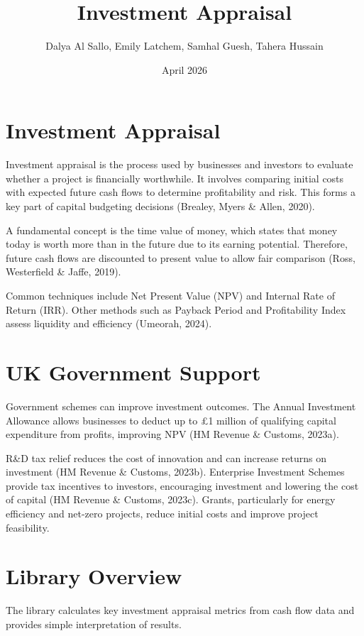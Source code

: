 \documentclass{article}
\title{Investment Appraisal}
\author{Dalya Al Sallo, Emily Latchem, Samhal Guesh, Tahera Hussain}
\date{April 2026}
\begin{document}
\maketitle

\section{Investment Appraisal}

Investment appraisal is the process used by businesses and investors to evaluate whether a project is financially worthwhile. It involves comparing initial costs with expected future cash flows to determine profitability and risk. This forms a key part of capital budgeting decisions (Brealey, Myers \& Allen, 2020).

A fundamental concept is the time value of money, which states that money today is worth more than in the future due to its earning potential. Therefore, future cash flows are discounted to present value to allow fair comparison (Ross, Westerfield \& Jaffe, 2019).

Common techniques include Net Present Value (NPV) and Internal Rate of Return (IRR). Other methods such as Payback Period and Profitability Index assess liquidity and efficiency (Umeorah, 2024).

\section{UK Government Support}

Government schemes can improve investment outcomes. The Annual Investment Allowance allows businesses to deduct up to £1 million of qualifying capital expenditure from profits, improving NPV (HM Revenue \& Customs, 2023a).

R\&D tax relief reduces the cost of innovation and can increase returns on investment (HM Revenue \& Customs, 2023b). Enterprise Investment Schemes provide tax incentives to investors, encouraging investment and lowering the cost of capital (HM Revenue \& Customs, 2023c). Grants, particularly for energy efficiency and net-zero projects, reduce initial costs and improve project feasibility.

\section{Library Overview}

The library calculates key investment appraisal metrics from cash flow data and provides simple interpretation of results.
\end{document}
